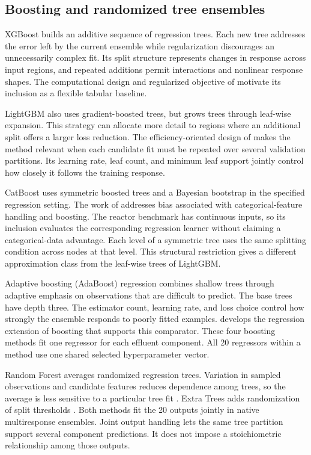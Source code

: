 \subsection{Boosting and randomized tree ensembles}

XGBoost builds an additive sequence of regression trees. Each new tree addresses the error left by the current ensemble while regularization discourages an unnecessarily complex fit. Its split structure represents changes in response across input regions, and repeated additions permit interactions and nonlinear response shapes. The computational design and regularized objective of \citet{ChenGuestrin2016} motivate its inclusion as a flexible tabular baseline.

LightGBM also uses gradient-boosted trees, but grows trees through leaf-wise expansion. This strategy can allocate more detail to regions where an additional split offers a larger loss reduction. The efficiency-oriented design of \citet{Ke2017} makes the method relevant when each candidate fit must be repeated over several validation partitions. Its learning rate, leaf count, and minimum leaf support jointly control how closely it follows the training response.

CatBoost uses symmetric boosted trees and a Bayesian bootstrap in the specified regression setting. The work of \citet{Prokhorenkova2018} addresses bias associated with categorical-feature handling and boosting. The reactor benchmark has continuous inputs, so its inclusion evaluates the corresponding regression learner without claiming a categorical-data advantage. Each level of a symmetric tree uses the same splitting condition across nodes at that level. This structural restriction gives a different approximation class from the leaf-wise trees of LightGBM.

Adaptive boosting (AdaBoost) regression combines shallow trees through adaptive emphasis on observations that are difficult to predict. The base trees have depth three. The estimator count, learning rate, and loss choice control how strongly the ensemble responds to poorly fitted examples. \citet{Drucker1997} develops the regression extension of boosting that supports this comparator. These four boosting methods fit one regressor for each effluent component. All 20 regressors within a method use one shared selected hyperparameter vector.

Random Forest averages randomized regression trees. Variation in sampled observations and candidate features reduces dependence among trees, so the average is less sensitive to a particular tree fit \citep{Breiman2001}. Extra Trees adds randomization of split thresholds \citep{Geurts2006}. Both methods fit the 20 outputs jointly in native multiresponse ensembles. Joint output handling lets the same tree partition support several component predictions. It does not impose a stoichiometric relationship among those outputs.

